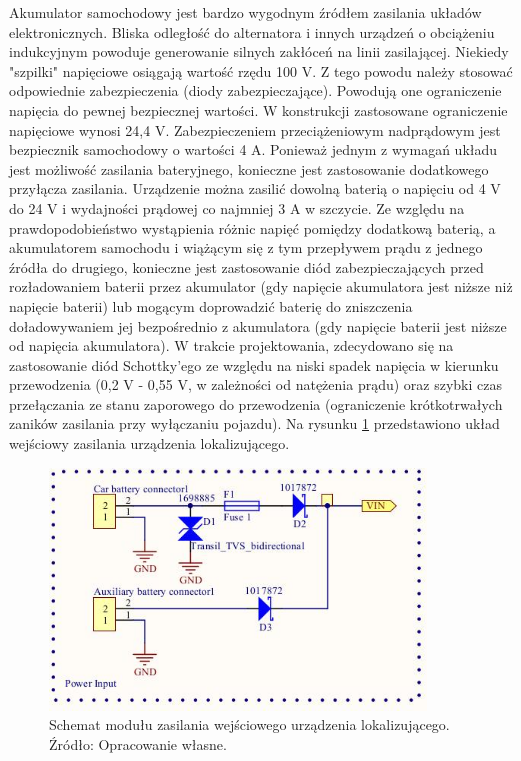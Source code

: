 Akumulator samochodowy jest bardzo wygodnym źródłem zasilania układów elektronicznych. Bliska odległość do alternatora i innych urządzeń o obciążeniu indukcyjnym powoduje generowanie silnych zakłóceń na linii zasilającej. Niekiedy "szpilki" napięciowe osiągają wartość rzędu 100 V. Z tego powodu należy stosować odpowiednie zabezpieczenia (diody zabezpieczające). Powodują one ograniczenie  napięcia do pewnej bezpiecznej wartości. W konstrukcji zastosowane ograniczenie napięciowe wynosi 24,4 V. Zabezpieczeniem przeciążeniowym nadprądowym jest bezpiecznik samochodowy o wartości 4 A. 
Ponieważ jednym z wymagań układu jest możliwość zasilania bateryjnego, konieczne jest zastosowanie dodatkowego przyłącza zasilania. Urządzenie można zasilić dowolną baterią o napięciu od 4 V do 24 V i wydajności prądowej co najmniej 3 A w szczycie. Ze względu na prawdopodobieństwo wystąpienia różnic napięć pomiędzy dodatkową baterią, a akumulatorem samochodu i wiążącym się z tym przepływem prądu z jednego źródła do drugiego, konieczne jest zastosowanie diód zabezpieczających przed rozładowaniem baterii przez akumulator (gdy napięcie akumulatora jest niższe niż napięcie baterii) lub mogącym doprowadzić baterię do zniszczenia doładowywaniem jej bezpośrednio z akumulatora (gdy napięcie baterii jest niższe od napięcia akumulatora). W trakcie projektowania, zdecydowano się na zastosowanie diód Schottky’ego ze względu na niski spadek napięcia w kierunku przewodzenia (0,2 V - 0,55 V, w zależności od natężenia prądu) oraz szybki czas przełączania ze stanu zaporowego do przewodzenia (ograniczenie krótkotrwałych zaników zasilania przy wyłączaniu pojazdu). Na rysunku \ref{fig:image_mainboard_power_input} przedstawiono układ wejściowy zasilania urządzenia lokalizującego.

\begin{figure}[H]
	\centering
	\includegraphics[width=10cm]{img/schematics/mainboard_power_input.jpg}
	\caption{Schemat modułu zasilania wejściowego urządzenia lokalizującego. \\ Źródło: Opracowanie własne.}
	\label{fig:image_mainboard_power_input}
\end{figure}


